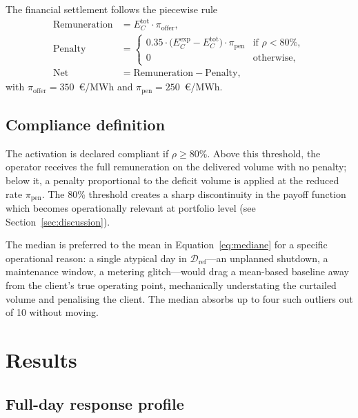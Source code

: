 \documentclass{article}
\begin{document}
The financial settlement follows the piecewise rule
\begin{align}
\text{Remuneration} &= E_C^{\text{tot}} \cdot \pi_{\text{offer}}, \label{eq:remun}\\
\text{Penalty} &=
  \begin{cases}
    0.35 \cdot \bigl(E_C^{\text{exp}} - E_C^{\text{tot}}\bigr) \cdot \pi_{\text{pen}}
      & \text{if } \rho < 80\%,\\[0.2em]
    0 & \text{otherwise},
  \end{cases} \label{eq:pen}\\
\text{Net} &= \text{Remuneration} - \text{Penalty}, \label{eq:net}
\end{align}
with $\pi_{\text{offer}} = 350$~\euro/MWh and $\pi_{\text{pen}} = 250$~\euro/MWh.

\subsection{Compliance definition}

The activation is declared compliant if $\rho \geq 80\%$. Above this threshold, the operator receives the full remuneration on the delivered volume with no penalty; below it, a penalty proportional to the deficit volume is applied at the reduced rate $\pi_{\text{pen}}$. The 80\% threshold creates a sharp discontinuity in the payoff function which becomes operationally relevant at portfolio level (see Section~\ref{sec:discussion}).

The median is preferred to the mean in Equation~\eqref{eq:mediane} for a specific operational reason: a single atypical day in $\mathcal{D}_{\text{ref}}$---an unplanned shutdown, a maintenance window, a metering glitch---would drag a mean-based baseline away from the client's true operating point, mechanically understating the curtailed volume and penalising the client. The median absorbs up to four such outliers out of 10 without moving.

\section{Results}

\subsection{Full-day response profile}
\label{sec:fullday}
\end{document}
